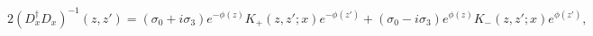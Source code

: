 \begin{equation}\label{ddagdinverse}
2\left(D_x^\dagger D_x\right)^{-1}(z,z')=
(\sigma_0+i\sigma_3)e^{-\phi(z)}K_+(z,z';x)e^{-\phi(z')}+
(\sigma_0-i\sigma_3)e^{\phi(z)}K_-(z,z';x)e^{\phi(z')},
\end{equation}

